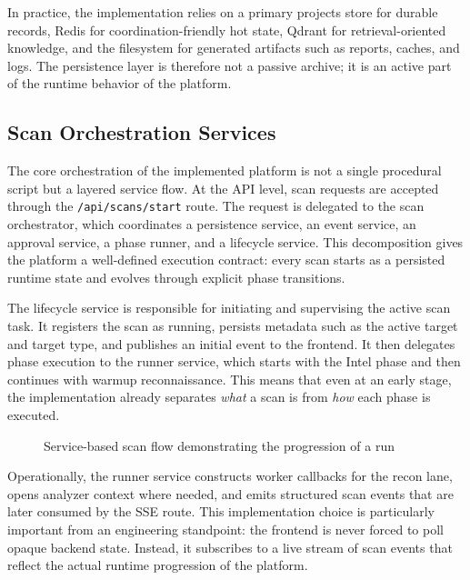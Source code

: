 \documentclass[12pt,a4paper]{report}
\begin{document}
In practice, the implementation relies on a primary projects store for durable
records, Redis for coordination-friendly hot state, Qdrant for retrieval-oriented
knowledge, and the filesystem for generated artifacts such as reports, caches, and
logs. The persistence layer is therefore not a passive archive; it is an active part
of the runtime behavior of the platform.

\subsection{Scan Orchestration Services}

The core orchestration of the implemented platform is not a single procedural script
but a layered service flow. At the API level, scan requests are accepted through the
\texttt{/api/scans/start} route. The request is delegated to the scan orchestrator,
which coordinates a persistence service, an event service, an approval service, a
phase runner, and a lifecycle service. This decomposition gives the platform a
well-defined execution contract: every scan starts as a persisted runtime state and
evolves through explicit phase transitions.

The lifecycle service is responsible for initiating and supervising the active scan
task. It registers the scan as running, persists metadata such as the active target
and target type, and publishes an initial event to the frontend. It then delegates
phase execution to the runner service, which starts with the Intel phase and then
continues with warmup reconnaissance. This means that even at an early stage, the
implementation already separates \emph{what} a scan is from \emph{how} each phase is
executed.

\begin{figure}[H]
    \centering
    \caption{Service-based scan flow demonstrating the progression of a run}
    \label{fig:langgraph_flow}
\end{figure}

Operationally, the runner service constructs worker callbacks for the recon lane,
opens analyzer context where needed, and emits structured scan events that are later
consumed by the SSE route. This implementation choice is particularly important from
an engineering standpoint: the frontend is never forced to poll opaque backend state.
Instead, it subscribes to a live stream of scan events that reflect the actual
runtime progression of the platform.
\end{document}
